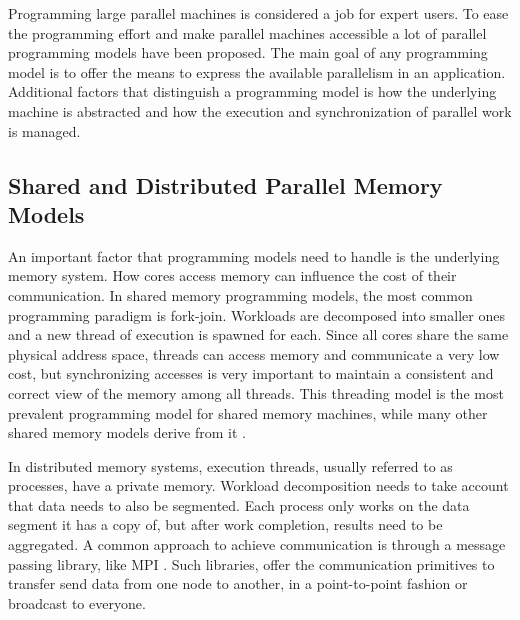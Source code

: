 
Programming large parallel machines is considered a job for expert users.  To ease the
programming effort and make parallel machines accessible a lot of parallel programming
models have been proposed.  The main goal of any programming model is to offer the means
to express the available parallelism in an application.  Additional factors that
distinguish a programming model is how the underlying machine is abstracted and how the
execution and synchronization of parallel work is managed.  

\subsection{Shared and Distributed Parallel Memory Models}
An important factor that programming models need to handle is the underlying memory
system.  How cores access memory can influence the cost of their communication.  In shared
memory programming models, the most common programming paradigm is fork-join.  Workloads
are decomposed into smaller ones and a new thread of execution is spawned for each.  Since
all cores share the same physical address space, threads can access memory and communicate
a very low cost, but synchronizing accesses is very important to maintain a consistent and
correct view of the memory among all threads.  This threading model is the most prevalent
programming model for shared memory machines, while many other shared memory models derive
from it \cite{openmp13,Blumofe1995,Reinders:2007:ITB:1461409,Kale:1993:CPC:165854.165874}.  

In distributed memory systems, execution threads, usually referred to as processes, have a
private memory.  Workload decomposition needs to take account that data needs to also be
segmented.  Each process only works on the data segment it has a copy of, but after work
completion, results need to be aggregated.  A common approach to achieve communication is
through a message passing library, like MPI \cite{Nagle:2005:MCR:1239662.1239666}.  Such
libraries, offer the communication primitives to transfer send data from one node to
another, in a point-to-point fashion or broadcast to everyone.

